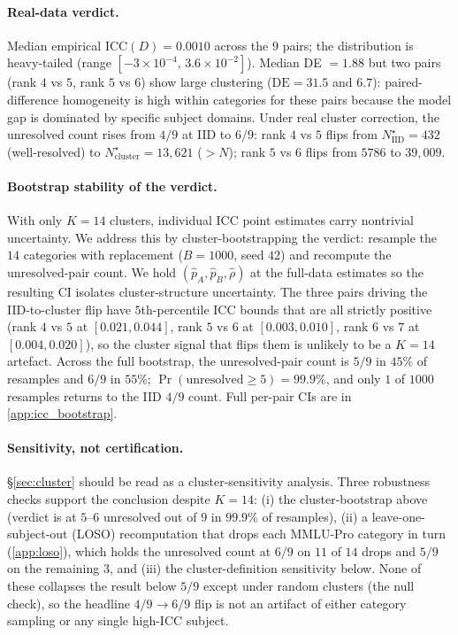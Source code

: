 \documentclass{article}
\theoremstyle{plain}
\theoremstyle{definition}
\begin{document}
\paragraph{Real-data verdict.} Median empirical $\mathrm{ICC}(D) = 0.0010$ across the $9$ pairs; the distribution is heavy-tailed (range $[-3\!\times\!10^{-4},\, 3.6\!\times\!10^{-2}]$). Median DE $=1.88$ but two pairs (rank $4$ vs $5$, rank $5$ vs $6$) show large clustering ($\mathrm{DE} = 31.5$ and $6.7$): paired-difference homogeneity is high within categories for these pairs because the model gap is dominated by specific subject domains. Under real cluster correction, the unresolved count rises from $4/9$ at IID to $6/9$: rank $4$ vs $5$ flips from $N^{\star}_{\mathrm{IID}}=432$ (well-resolved) to $N^{\star}_{\mathrm{cluster}}=13{,}621$ ($>N$); rank $5$ vs $6$ flips from $5786$ to $39{,}009$.

\paragraph{Bootstrap stability of the verdict.} With only $K{=}14$ clusters, individual ICC point estimates carry nontrivial uncertainty. We address this by cluster-bootstrapping the verdict: resample the $14$ categories with replacement ($B{=}1000$, seed $42$) and recompute the unresolved-pair count. We hold $(\hat p_A,\hat p_B,\hat\rho)$ at the full-data estimates so the resulting CI isolates cluster-structure uncertainty. The three pairs driving the IID-to-cluster flip have $5$th-percentile ICC bounds that are all strictly positive (rank $4$ vs $5$ at $[0.021, 0.044]$, rank $5$ vs $6$ at $[0.003, 0.010]$, rank $6$ vs $7$ at $[0.004, 0.020]$), so the cluster signal that flips them is unlikely to be a $K{=}14$ artefact. Across the full bootstrap, the unresolved-pair count is $5/9$ in $45\%$ of resamples and $6/9$ in $55\%$; $\Pr(\text{unresolved}\!\geq\!5)=99.9\%$, and only $1$ of $1000$ resamples returns to the IID $4/9$ count. Full per-pair CIs are in \cref{app:icc_bootstrap}.

\paragraph{Sensitivity, not certification.} \S\ref{sec:cluster} should be read as a cluster-sensitivity analysis. Three robustness checks support the conclusion despite $K{=}14$: (i) the cluster-bootstrap above (verdict is at $5$--$6$ unresolved out of $9$ in $99.9\%$ of resamples), (ii) a leave-one-subject-out (LOSO) recomputation that drops each MMLU-Pro category in turn (\cref{app:loso}), which holds the unresolved count at $6/9$ on $11$ of $14$ drops and $5/9$ on the remaining $3$, and (iii) the cluster-definition sensitivity below. None of these collapses the result below $5/9$ except under random clusters (the null check), so the headline $4/9\to 6/9$ flip is not an artifact of either category sampling or any single high-ICC subject.
\end{document}
